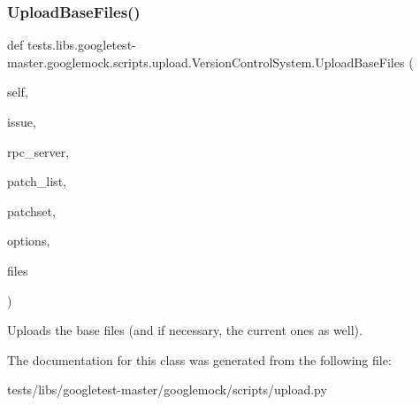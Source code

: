 \subsubsection{\texorpdfstring{Upload\+Base\+Files()}{UploadBaseFiles()}}
{\footnotesize\ttfamily def tests.\+libs.\+googletest-\/master.\+googlemock.\+scripts.\+upload.\+Version\+Control\+System.\+Upload\+Base\+Files (\begin{DoxyParamCaption}\item[{}]{self,  }\item[{}]{issue,  }\item[{}]{rpc\+\_\+server,  }\item[{}]{patch\+\_\+list,  }\item[{}]{patchset,  }\item[{}]{options,  }\item[{}]{files }\end{DoxyParamCaption})}

\begin{DoxyVerb}Uploads the base files (and if necessary, the current ones as well).\end{DoxyVerb}
 

The documentation for this class was generated from the following file\+:\begin{DoxyCompactItemize}
\item 
tests/libs/googletest-\/master/googlemock/scripts/upload.\+py\end{DoxyCompactItemize}
